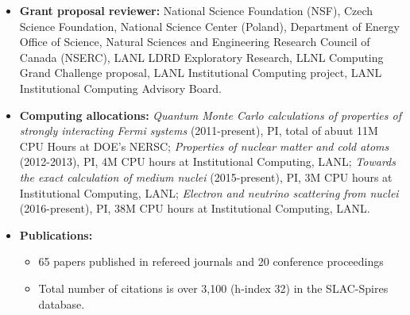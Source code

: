 \documentclass[11pt]{article}
\begin{document}
\begin{itemize}
\item {\bf Grant proposal reviewer:}
National Science Foundation (NSF), Czech Science Foundation, National Science Center (Poland),
Department of Energy Office of Science, Natural Sciences and Engineering Research Council of Canada (NSERC),
LANL LDRD Exploratory Research, LLNL Computing Grand Challenge proposal, LANL Institutional Computing project,
LANL Institutional Computing Advisory Board.

\item {\bf Computing allocations:}
\emph{Quantum Monte Carlo calculations of properties of strongly interacting Fermi systems} 
(2011-present), PI, total of abuut 11M CPU Hours at DOE's NERSC;
\emph{Properties of nuclear matter and cold atoms} (2012-2013), PI, 4M CPU hours at Institutional 
Computing, LANL;
\emph{Towards the exact calculation of medium nuclei} (2015-present), PI, 3M CPU hours at Institutional
Computing, LANL;
\emph{Electron and neutrino scattering from nuclei} (2016-present), PI, 38M CPU hours at Institutional 
Computing, LANL.




\item{\bf Publications:}
\begin{itemize}
\item  65 papers published in refereed journals and 20 conference proceedings
\item Total number of citations is over 3,100 (h-index 32) in the SLAC-Spires database.
\end{itemize}
 

\end{itemize}
\end{document}
